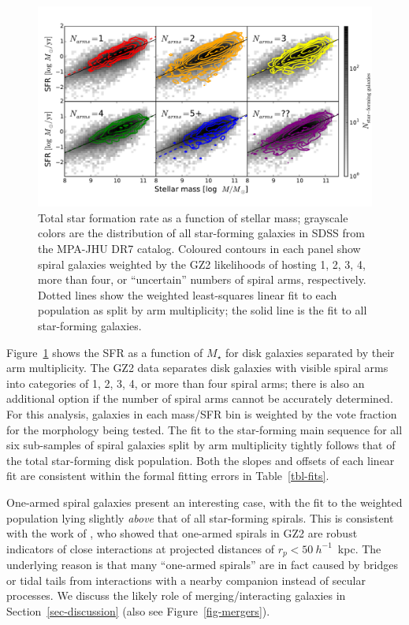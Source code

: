 \documentclass[useAMS,usenatbib]{mn2e}
\begin{document}
\begin{figure}
\includegraphics[angle=0,width=7.0in]{figures/masslim/ms_arms_number_weighted_contour.pdf}
\caption{Total star formation rate as a function of stellar mass; grayscale colors are the distribution of all star-forming galaxies in SDSS from the MPA-JHU DR7 catalog. Coloured contours in each panel show spiral galaxies weighted by the GZ2 likelihoods of hosting 1, 2, 3, 4, more than four, or ``uncertain'' numbers of spiral arms, respectively. Dotted lines show the weighted least-squares linear fit to each population as split by arm multiplicity; the solid line is the fit to all star-forming galaxies. 
\label{fig-number}}
\end{figure}

Figure~\ref{fig-number} shows the SFR as a function of $M_\star$ for disk galaxies separated by their arm multiplicity. The GZ2 data separates disk galaxies with visible spiral arms into categories of 1, 2, 3, 4, or more than four spiral arms; there is also an additional option if the number of spiral arms cannot be accurately determined. For this analysis, galaxies in each mass/SFR bin is weighted by the vote fraction for the morphology being tested. The fit to the star-forming main sequence for all six sub-samples of spiral galaxies split by arm multiplicity tightly follows that of the total star-forming disk population. Both the slopes and offsets of each linear fit are consistent within the formal fitting errors in Table~\ref{tbl-fits}.

One-armed spiral galaxies present an interesting case, with the fit to the weighted population lying slightly \emph{above} that of all star-forming spirals. This is consistent with the work of \citet{cas13}, who showed that one-armed spirals in GZ2 are robust indicators of close interactions at projected distances of $r_p < 50~h^{-1}$~kpc. The underlying reason is that many ``one-armed spirals'' are in fact caused by bridges or tidal tails from interactions with a nearby companion instead of secular processes. We discuss the likely role of merging/interacting galaxies in Section~\ref{sec-discussion} (also see Figure~\ref{fig-mergers}).
\end{document}
